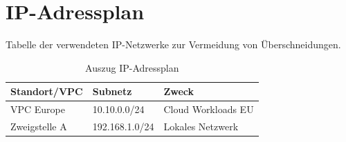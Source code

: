 \chapter{IP-Adressplan}

Tabelle der verwendeten IP-Netzwerke zur Vermeidung von Überschneidungen.

\begin{table}[htbp]
\centering
\begin{tabular}{lll}
\toprule
\textbf{Standort/VPC} & \textbf{Subnetz} & \textbf{Zweck} \\
\midrule
VPC Europe & 10.10.0.0/24 & Cloud Workloads EU \\
Zweigstelle A & 192.168.1.0/24 & Lokales Netzwerk \\
\bottomrule
\end{tabular}
\caption{Auszug IP-Adressplan}
\end{table}